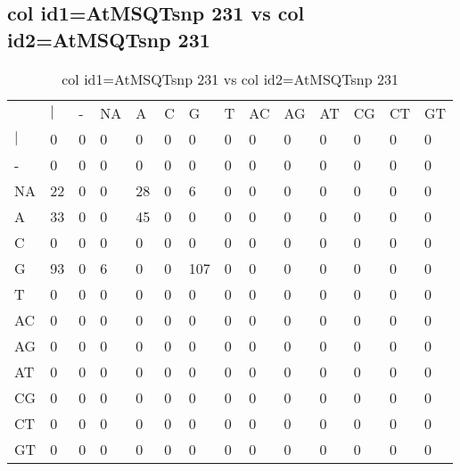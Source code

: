 \subsection{col id1=AtMSQTsnp 231 vs col id2=AtMSQTsnp 231}
\begin{center}
\begin{longtable}{|l|l|l|l|l|l|l|l|l|l|l|l|l|l|}
\caption{col id1=AtMSQTsnp 231 vs col id2=AtMSQTsnp 231} \label{table_dm784}\\
\hline
\\
\hline
&$|$&-&NA&A&C&G&T&AC&AG&AT&CG&CT&GT\\
$|$&0&0&0&0&0&0&0&0&0&0&0&0&0\\
-&0&0&0&0&0&0&0&0&0&0&0&0&0\\
NA&22&0&0&28&0&6&0&0&0&0&0&0&0\\
A&33&0&0&45&0&0&0&0&0&0&0&0&0\\
C&0&0&0&0&0&0&0&0&0&0&0&0&0\\
G&93&0&6&0&0&107&0&0&0&0&0&0&0\\
T&0&0&0&0&0&0&0&0&0&0&0&0&0\\
AC&0&0&0&0&0&0&0&0&0&0&0&0&0\\
AG&0&0&0&0&0&0&0&0&0&0&0&0&0\\
AT&0&0&0&0&0&0&0&0&0&0&0&0&0\\
CG&0&0&0&0&0&0&0&0&0&0&0&0&0\\
CT&0&0&0&0&0&0&0&0&0&0&0&0&0\\
GT&0&0&0&0&0&0&0&0&0&0&0&0&0\\
\hline
\end{longtable}
\end{center}

